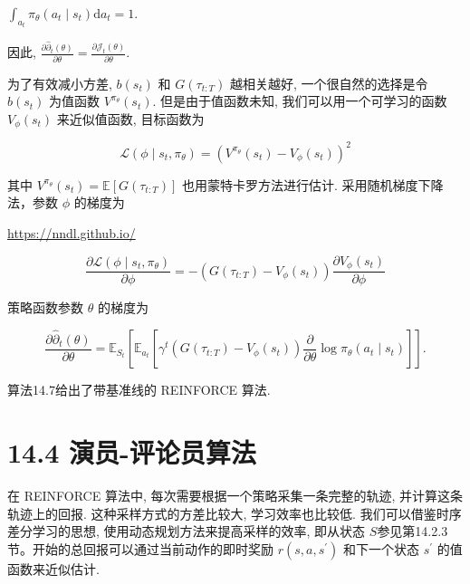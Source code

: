 \documentclass[10pt]{article}
\begin{document}
$\int_{a_{t}} \pi_{\theta}\left(a_{t} \mid s_{t}\right) \mathrm{d} a_{t}=1$.

因此, $\frac{\partial \hat{\partial}_{t}(\theta)}{\partial \theta}=\frac{\partial \mathcal{J}_{t}(\theta)}{\partial \theta}$.

为了有效减小方差, $b\left(s_{t}\right)$ 和 $G\left(\tau_{t: T}\right)$ 越相关越好, 一个很自然的选择是令 $b\left(s_{t}\right)$ 为值函数 $V^{\pi_{\theta}}\left(s_{t}\right)$. 但是由于值函数未知, 我们可以用一个可学习的函数 $V_{\phi}\left(s_{t}\right)$ 来近似值函数, 目标函数为


\begin{equation*}
\mathcal{L}\left(\phi \mid s_{t}, \pi_{\theta}\right)=\left(V^{\pi_{\theta}}\left(s_{t}\right)-V_{\phi}\left(s_{t}\right)\right)^{2} \tag{14.68}
\end{equation*}


其中 $V^{\pi_{\theta}}\left(s_{t}\right)=\mathbb{E}\left[G\left(\tau_{t: T}\right)\right]$ 也用蒙特卡罗方法进行估计. 采用随机梯度下降法，参数 $\phi$ 的梯度为

\href{https://nndl.github.io/}{https://nndl.github.io/}


\begin{equation*}
\frac{\partial \mathcal{L}\left(\phi \mid s_{t}, \pi_{\theta}\right)}{\partial \phi}=-\left(G\left(\tau_{t: T}\right)-V_{\phi}\left(s_{t}\right)\right) \frac{\partial V_{\phi}\left(s_{t}\right)}{\partial \phi} \tag{14.69}
\end{equation*}


策略函数参数 $\theta$ 的梯度为


\begin{equation*}
\frac{\partial \hat{\partial}_{t}(\theta)}{\partial \theta}=\mathbb{E}_{S_{t}}\left[\mathbb{E}_{a_{t}}\left[\gamma^{t}\left(G\left(\tau_{t: T}\right)-V_{\phi}\left(s_{t}\right)\right) \frac{\partial}{\partial \theta} \log \pi_{\theta}\left(a_{t} \mid s_{t}\right)\right]\right] . \tag{14.70}
\end{equation*}


算法14.7给出了带基准线的 REINFORCE 算法.



\section*{14.4 演员-评论员算法}
在 REINFORCE 算法中, 每次需要根据一个策略采集一条完整的轨迹, 并计算这条轨迹上的回报. 这种采样方式的方差比较大, 学习效率也比较低. 我们可以借鉴时序差分学习的思想, 使用动态规划方法来提高采样的效率, 即从状态 $S$参见第14.2.3节。开始的总回报可以通过当前动作的即时奖励 $r\left(s, a, s^{\prime}\right)$ 和下一个状态 $s^{\prime}$ 的值函数来近似估计.
\end{document}
